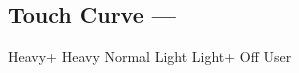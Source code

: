 \subsection[Touch Curve]{Touch Curve --- \UiKey{\I}\UiKey{\SET}}









































Heavy+
Heavy
Normal
Light
Light+
Off
User
